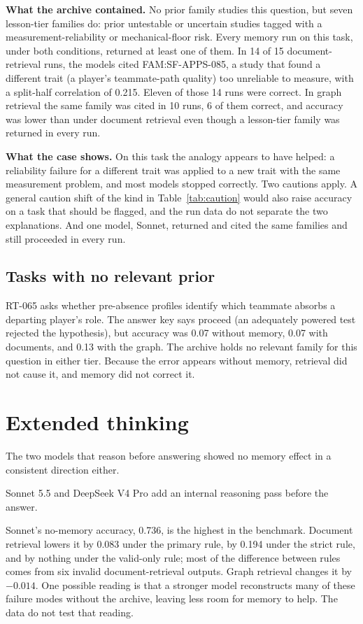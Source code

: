 \documentclass[11pt]{article}
\begin{document}
\textbf{What the archive contained.} No prior family studies this question, but seven lesson-tier families do: prior untestable or uncertain studies tagged with a measurement-reliability or mechanical-floor risk. Every memory run on this task, under both conditions, returned at least one of them. In 14 of 15 document-retrieval runs, the models cited FAM:SF-APPS-085, a study that found a different trait (a player's teammate-path quality) too unreliable to measure, with a split-half correlation of 0.215. Eleven of those 14 runs were correct. In graph retrieval the same family was cited in 10 runs, 6 of them correct, and accuracy was lower than under document retrieval even though a lesson-tier family was returned in every run.

\textbf{What the case shows.} On this task the analogy appears to have helped: a reliability failure for a different trait was applied to a new trait with the same measurement problem, and most models stopped correctly. Two cautions apply. A general caution shift of the kind in Table~\ref{tab:caution} would also raise accuracy on a task that should be flagged, and the run data do not separate the two explanations. And one model, Sonnet, returned and cited the same families and still proceeded in every run.

\subsection{Tasks with no relevant prior}

RT-065 asks whether pre-absence profiles identify which teammate absorbs a departing player's role. The answer key says proceed (an adequately powered test rejected the hypothesis), but accuracy was 0.07 without memory, 0.07 with documents, and 0.13 with the graph. The archive holds no relevant family for this question in either tier. Because the error appears without memory, retrieval did not cause it, and memory did not correct it.

\section{Extended thinking}
\label{sec:reasoning}

The two models that reason before answering showed no memory effect in a consistent direction either.

Sonnet 5.5 and DeepSeek V4 Pro add an internal reasoning pass before the answer.

Sonnet's no-memory accuracy, 0.736, is the highest in the benchmark. Document retrieval lowers it by 0.083 under the primary rule, by 0.194 under the strict rule, and by nothing under the valid-only rule; most of the difference between rules comes from six invalid document-retrieval outputs. Graph retrieval changes it by $-0.014$. One possible reading is that a stronger model reconstructs many of these failure modes without the archive, leaving less room for memory to help. The data do not test that reading.
\end{document}
